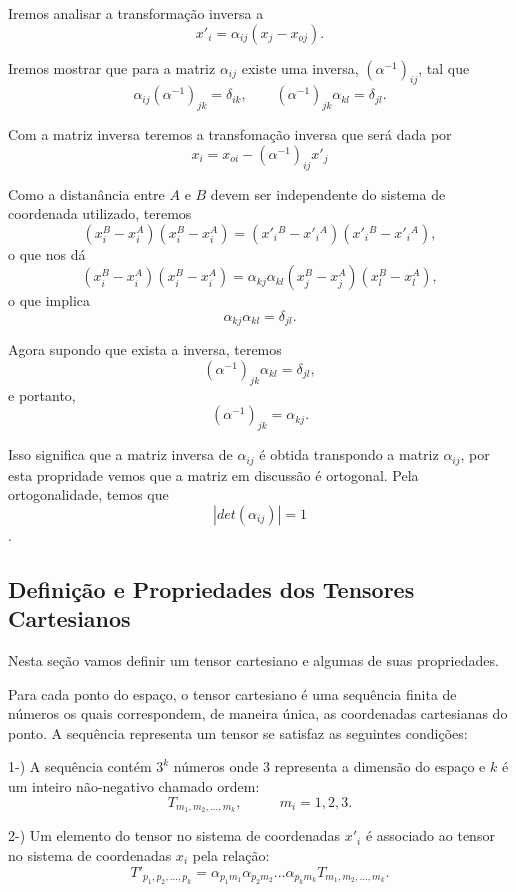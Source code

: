 Iremos analisar a transforma\c{c}\~ao inversa a
\[x'_{i}=\alpha_{ij}(x_{j}-x_{oj}).\]

Iremos mostrar que para a matriz $\alpha_{ij}$ existe uma inversa,
$(\alpha^{-1})_{ij}$, tal que
\[\alpha_{ij}(\alpha^{-1})_{jk}=\delta_{ik}, \mbox{    }\mbox{    }\mbox{    }(\alpha^{-1})_{jk}\alpha_{kl}=\delta_{jl}.\]

Com a matriz inversa teremos a transfoma\c{c}\~ao inversa que
ser\'a dada por
\[x_{i}=x_{oi}-(\alpha^{-1})_{ij}x'_{j}\]

Como a distan\^ancia entre $A$ e $B$ devem ser independente do
sistema de coordenada utilizado, teremos
\[ (x_{i}^{B}-x_{i}^{A})(x_{i}^{B}-x_{i}^{A})=(x'_i{}^{B}-x'_i{}^{A})(x'_i{}^{B}-x'_i{}^{A}),\]
o que nos d\'a
\[ (x_{i}^{B}-x_{i}^{A})(x_{i}^{B}-x_{i}^{A})=\alpha_{kj}\alpha_{kl}(x_{j}^{B}-x_{j}^{A})(x_{l}^{B}-x_{l}^{A}),\]
o que implica
\[ \alpha_{kj}\alpha_{kl}=\delta_{jl}.\]

Agora supondo que exista a inversa, teremos
\[(\alpha^{-1})_{jk}\alpha_{kl}=\delta_{jl},\]
e portanto,
\[(\alpha^{-1})_{jk}=\alpha_{kj}.\]

Isso significa que a matriz inversa de $\alpha_{ij}$ \'e obtida
transpondo a matriz $\alpha_{ij}$, por esta propridade vemos que a
matriz em discuss\~ao \'e ortogonal. Pela ortogonalidade, temos
que
\[|det(\alpha_{ij})|=1\].

\subsection{Defini\c{c}\~ao e Propriedades dos Tensores Cartesianos}

Nesta se\c{c}\~ao vamos definir um tensor cartesiano e algumas de
suas propriedades.

Para cada ponto do espa\c{c}o, o tensor cartesiano \'e uma
sequ\^encia
 finita de n\'umeros os quais correspondem, de maneira \'unica, as coordenadas
cartesianas do ponto. A sequ\^encia representa um tensor se
satisfaz as seguintes  condi\c{c}\~oes:

1-) A sequ\^encia cont\'em $3^{k}$ n\'umeros onde $3$ representa a
dimens\~ao do espa\c{c}o e $k$ \'e um inteiro n\~ao-negativo
chamado ordem:
\[T_{m_{1},m_{2},...,m_{k}}, \mbox{   }\mbox{   }\mbox{   }\mbox{   } m_{i}=1,2,3.\]

2-) Um elemento do tensor no sistema de coordenadas $x'_{i}$ \'e
associado ao tensor no sistema de coordenadas $x_{i}$ pela
rela\c{c}\~ao:
\[T'_{p_{1},p_{2},...,p_{k}}=
\alpha_{p_{1}m_{1}}\alpha_{p_{2}m_{2}}...\alpha_{p_{k}m_{k}}T_{m_{1},m_{2},...,m_{k}}.\]

